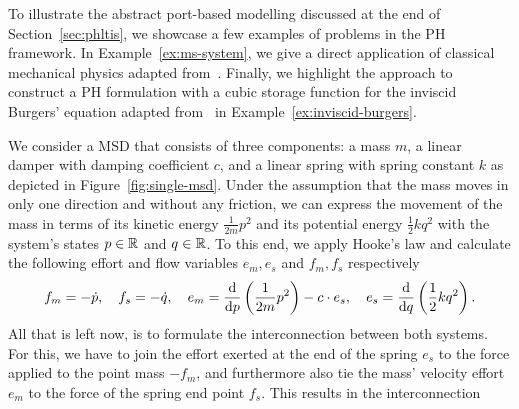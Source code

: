 To illustrate the abstract port-based modelling discussed at the end of Section~\ref{sec:phltis}, we showcase a few examples of problems in the \ac{PH} framework.
In Example~\ref{ex:ms-system}, we give a direct application of classical mechanical physics adapted from~\cite[Example~2.1]{VanDerSchaft2014}.
Finally, we highlight the approach to construct a \ac{PH} formulation with a cubic storage function for the inviscid Burgers' equation adapted from~\cite[Example~2.1]{Maschke2005} in Example~\ref{ex:inviscid-burgers}.

\begin{example}\label{ex:ms-system}
    We consider a \ac{MSD} that consists of three components: a mass $m$, a linear damper with damping coefficient $c$, and a linear spring with spring constant $k$ as depicted in Figure~\ref{fig:single-msd}.
    Under the assumption that the mass moves in only one direction and without any friction, we can express the movement of the mass in terms of its kinetic energy $\frac{1}{2m} p^2$ and its potential energy $\frac{1}{2} k q^2$ with the system's states $p \in \mathbb{R}$ and $q \in \mathbb{R}$.
    To this end, we apply Hooke's law and calculate the following effort and flow variables $e_m, e_s$ and $f_m, f_s$ respectively
    \begin{equation*}
        f_m = -\dot{p},\quad f_s = -\dot{q},\quad e_m = \frac{\mathop{}\!\mathrm{d}}{\mathop{}\!\mathrm{d} p} \left( \frac{1}{2m} p^2 \right) - c \cdot e_s,\quad e_s = \frac{\mathop{}\!\mathrm{d}}{\mathop{}\!\mathrm{d} q} \left( \frac{1}{2} k q^2 \right).
    \end{equation*}
    All that is left now, is to formulate the interconnection between both systems.
    For this, we have to join the effort exerted at the end of the spring $e_s$ to the force applied to the point mass $-f_m$, and furthermore also tie the mass' velocity effort $e_m$ to the force of the spring end point $f_s$.
    This results in the interconnection
    \begin{equation*}

\end{equation*}
\end{example}
